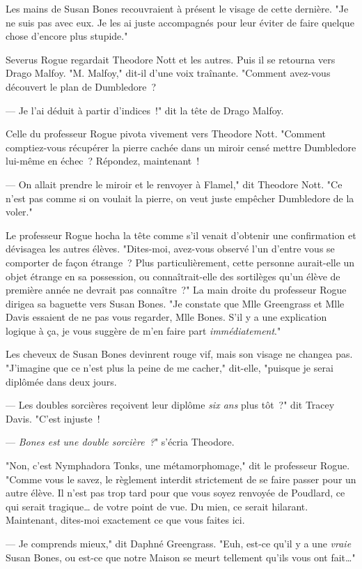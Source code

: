 Les mains de Susan Bones recouvraient à présent le visage de cette dernière. "Je ne suis pas avec eux. Je les ai juste accompagnés pour leur éviter de faire quelque chose d'encore plus stupide."

Severus Rogue regardait Theodore Nott et les autres. Puis il se retourna vers Drago Malfoy. "M. Malfoy," dit-il d'une voix traînante. "Comment avez-vous découvert le plan de Dumbledore~?

--- Je l'ai déduit à partir d'indices~!" dit la tête de Drago Malfoy.

Celle du professeur Rogue pivota vivement vers Theodore Nott. "Comment comptiez-vous récupérer la pierre cachée dans un miroir censé mettre Dumbledore lui-même en échec~? Répondez, maintenant~!

--- On allait prendre le miroir et le renvoyer à Flamel," dit Theodore Nott. "Ce n'est pas comme si on voulait la pierre, on veut juste empêcher Dumbledore de la voler."

Le professeur Rogue hocha la tête comme s'il venait d'obtenir une confirmation et dévisagea les autres élèves. "Dites-moi, avez-vous observé l'un d'entre vous se comporter de façon étrange~? Plus particulièrement, cette personne aurait-elle un objet étrange en sa possession, ou connaîtrait-elle des sortilèges qu'un élève de première année ne devrait pas connaître~?" La main droite du professeur Rogue dirigea sa baguette vers Susan Bones. "Je constate que Mlle Greengrass et Mlle Davis essaient de ne pas vous regarder, Mlle Bones. S'il y a une explication logique à ça, je vous suggère de m'en faire part \emph{immédiatement}."

Les cheveux de Susan Bones devinrent rouge vif, mais son visage ne changea pas. "J'imagine que ce n'est plus la peine de me cacher," dit-elle, "puisque je serai diplômée dans deux jours.

--- Les doubles sorcières reçoivent leur diplôme \emph{six ans} plus tôt~?" dit Tracey Davis. "C'est injuste~!

--- \emph{Bones est une double sorcière~?}" s'écria Theodore.

"Non, c'est Nymphadora Tonks, une métamorphomage," dit le professeur Rogue. "Comme vous le savez, le règlement interdit strictement de se faire passer pour un autre élève. Il n'est pas trop tard pour que vous soyez renvoyée de Poudlard, ce qui serait tragique… de votre point de vue. Du mien, ce serait hilarant. Maintenant, dites-moi exactement ce que vous faites ici.

--- Je comprends mieux," dit Daphné Greengrass. "Euh, est-ce qu'il y a une \emph{vraie} Susan Bones, ou est-ce que notre Maison se meurt tellement qu'ils vous ont fait…"


